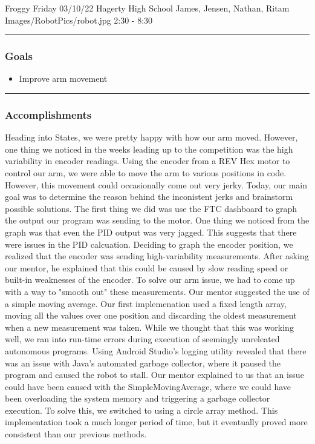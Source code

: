\insertmeeting 
	{Froggy Friday} 
	{03/10/22} 
	{Hagerty High School}
	{James, Jensen, Nathan, Ritam}
	{Images/RobotPics/robot.jpg}
	{2:30 - 8:30}
	
\noindent\hfil\rule{\textwidth}{.4pt}\hfil
\subsubsection*{Goals}
\begin{itemize}
    \item Improve arm movement

\end{itemize} 

\noindent\hfil\rule{\textwidth}{.4pt}\hfil

\subsubsection*{Accomplishments}
Heading into States, we were pretty happy with how our arm moved. However, one thing we noticed in the weeks leading up to the competition was the high variability in encoder readings. Using the encoder from a REV Hex motor to control our arm, we were able to move the arm to various positions in code. However, this movement could occasionally come out very jerky. Today, our main goal was to determine the reason behind the inconistent jerks and brainstorm possible solutions. The first thing we did was use the FTC dashboard to graph the output our program was sending to the motor. One thing we noticed from the graph was that even the PID output was very jagged. This suggests that there were issues in the PID calcuation. Deciding to graph the encoder position, we realized that the encoder was sending high-variability measurements. After asking our mentor, he explained that this could be caused by slow reading speed or built-in weaknesses of the encoder. To solve our arm issue, we had to come up with a way to "smooth out" these measurements. Our mentor suggested the use of a simple moving average. Our first implemenation used a fixed length array, moving all the values over one position and discarding the oldest measurement when a new measurement was taken. While we thought that this was working well, we ran into run-time errors during execution of seemingly unreleated autonomous programs. Using Android Studio's logging utility revealed that there was an issue with Java's automated garbage collector, where it paused the program and caused the robot to stall. Our mentor explained to us that an issue could have been caused with the SimpleMovingAverage, where we could have been overloading the system memory and triggering a garbage collector execution. To solve this, we switched to using a circle array method. This implementation took a much longer period of time, but it eventually proved more consistent than our previous methods. 


